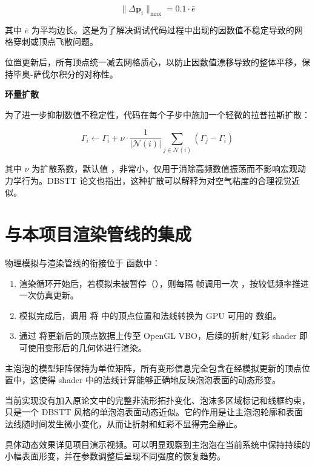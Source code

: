 \begin{equation}
\|\Delta\mathbf{p}_i\|_{\max} = 0.1 \cdot \bar{e}
\label{eq:max_displacement}
\end{equation}

其中 $\bar{e}$ 为平均边长。这是为了解决调试代码过程中出现的因数值不稳定导致的网格穿刺或顶点飞散问题。

位置更新后，所有顶点统一减去网格质心，以防止因数值漂移导致的整体平移，保持毕奥-萨伐尔积分的对称性。

\textbf{环量扩散}

为了进一步抑制数值不稳定性，代码在每个子步中施加一个轻微的拉普拉斯扩散：

\begin{equation}
\Gamma_i \leftarrow \Gamma_i + \nu \cdot \frac{1}{|\mathcal{N}(i)|} \sum_{j \in \mathcal{N}(i)} (\Gamma_j - \Gamma_i)
\label{eq:circulation_diffusion}
\end{equation}

其中 $\nu$ 为扩散系数，默认值 ，非常小，仅用于消除高频数值振荡而不影响宏观动力学行为。DBSTT 论文也指出，这种扩散可以解释为对空气粘度的合理视觉近似。

\section{与本项目渲染管线的集成}

物理模拟与渲染管线的衔接位于  函数中：

\begin{enumerate}
  \item 渲染循环开始后，若模拟未被暂停（），则每隔  帧调用一次 ，按较低频率推进一次仿真更新。
  \item 模拟完成后，调用  将  中的顶点位置和法线转换为 GPU 可用的  数组。
  \item 通过  将更新后的顶点数据上传至 OpenGL VBO，后续的折射/虹彩 shader 即可使用变形后的几何体进行渲染。
\end{enumerate}

主泡泡的模型矩阵保持为单位矩阵，所有变形信息完全包含在经模拟更新的顶点位置中，这使得 shader 中的法线计算能够正确地反映泡泡表面的动态形变。

当前实现没有加入原论文中的完整非流形拓扑变化、泡沫多区域标记和线框约束，只是一个 DBSTT 风格的单泡泡表面动态近似。它的作用是让主泡泡轮廓和表面法线随时间发生微小变化，从而让折射和虹彩不显得完全静止。      

具体动态效果详见项目演示视频。可以明显观察到主泡泡在当前系统中保持持续的小幅表面形变，并在参数调整后呈现不同强度的恢复趋势。

